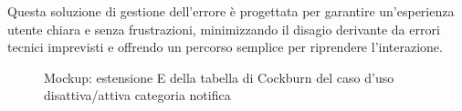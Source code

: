 Questa soluzione di gestione dell'errore è progettata per garantire un'esperienza utente chiara e senza frustrazioni, minimizzando il disagio derivante da errori tecnici imprevisti e offrendo un percorso semplice per riprendere l'interazione.
\begin{figure}[ht]
    \centering
    \caption{Mockup: estensione E della tabella di Cockburn del caso d'uso disattiva/attiva categoria notifica}
    \label{fig:mockup_estensione_E_disattiva_notifiche}
\end{figure}

\newpage

